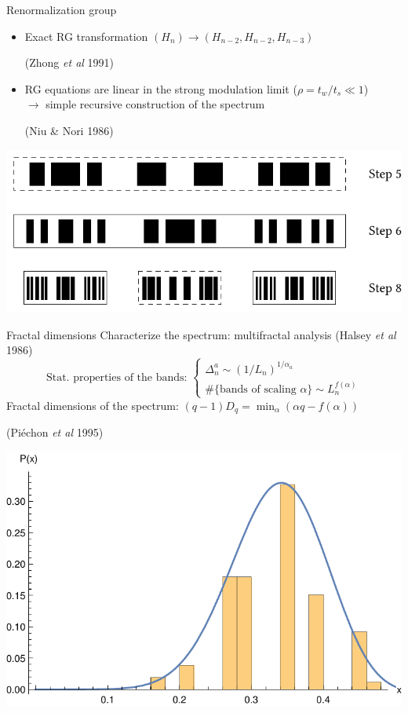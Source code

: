 \documentclass[xcolor=x11names,compress,professionalfonts]{beamer}
\renewcommand{\(}{\begin{columns}}
\renewcommand{\)}{\end{columns}}
\newcommand{\<}[1]{\begin{column}{#1}}
\renewcommand{\>}{\end{column}}
\newcommand{\ham}{\ensuremath{H}}
\begin{document}
\begin{frame}{Renormalization group}
\begin{itemize}
	\item Exact RG transformation $(\ham_n) \rightarrow (\ham_{n-2}, \ham_{n-2}, \ham_{n-3})$
	\begin{flushright}
	(Zhong \emph{et al} 1991)
	\end{flushright}
	\item RG equations are linear in the strong modulation limit ($\rho = t_w/t_s \ll 1$) \\ $\rightarrow$ simple recursive construction of the spectrum
	\begin{flushright}
	(Niu \& Nori 1986)
	\end{flushright}
\end{itemize}
	\centering
	\includegraphics[scale=.7]{recursive_construction_spectrum.pdf}
\end{frame}

\begin{frame}{Fractal dimensions}
	Characterize the spectrum: multifractal analysis (Halsey \emph{et al} 1986)
	\[
	\text{Stat. properties of the bands:~} 
	\begin{cases}
	\Delta_n^a \sim (1/L_n)^{1/\alpha_a} \\
	\#\{\text{bands of scaling~} \alpha \} \sim L_n^{f(\alpha)} 
	\end{cases}
	\]
	Fractal dimensions of the spectrum: $(q-1)D_q = \min_\alpha(\alpha q - f(\alpha))$
	\begin{flushright}
	(Piéchon \emph{et al} 1995)
	\end{flushright}
	\centering
	\includegraphics[scale=.45]{x_stat_th_comp.pdf}
\end{frame}
\end{document}
